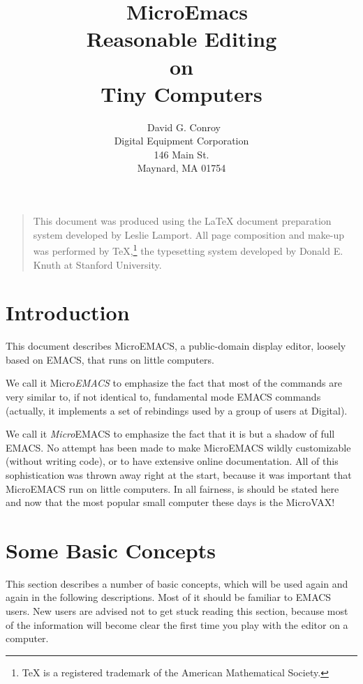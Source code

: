 \author{\
David G. Conroy \\
Digital Equipment Corporation \\
146 Main St. \\
Maynard, MA 01754
}
\title{\
  MicroEmacs \\[3ex]
  {\large Reasonable Editing } \\
  {\large on } \\
  {\large Tiny Computers } \\
}
\maketitle
{}
\vfill
\vfill			%
\begin{quotation}
This document was produced using the \LaTeX{} document
preparation system developed by Leslie
Lamport.  All page composition and make-up was performed
by \TeX,\footnote{\TeX{} is a registered trademark of the
American Mathematical Society.} the typesetting system developed by
Donald E. Knuth at Stanford University.
\end{quotation}
\vfill
\newpage
\tableofcontents
\newpage
\section{Introduction}
This document describes MicroEMACS, a
public-domain display editor, loosely based on EMACS, that runs on little
computers.

We call it Micro{\em EMACS\/} to emphasize the fact that
most of the commands are very similar to, if not identical to,
fundamental mode EMACS commands (actually, it implements a set of
rebindings used by a group of users at Digital).

We call it {\em Micro\/}EMACS to emphasize the fact that it is
but a shadow of full EMACS. No attempt has been made to make MicroEMACS
wildly
customizable (without writing code), or to have extensive online documentation.
All of this sophistication was thrown away right at the start, because
it was important that MicroEMACS run on little computers.
In all fairness, is should be stated here and now that the most popular
small computer these days is the MicroVAX!
\section{Some Basic Concepts}
This section describes a number of basic concepts,
which will be used again and again in the following descriptions.
Most of it should be familiar to EMACS users.
New users are advised not to get stuck reading this section,
because most of the information will become clear the first time you
play with the editor on a computer.
